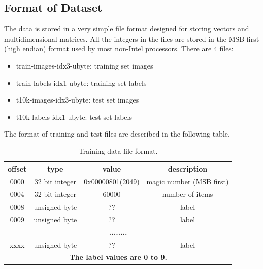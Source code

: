 \subsection{Format of Dataset}
The data is stored in a very simple file format designed for storing vectors and multidimensional matrices. All the integers in the files are stored in the MSB first (high endian) format used by most non-Intel processors. There are 4 files:
\begin{itemize}
  \item train-images-idx3-ubyte: training set images
  \item train-labels-idx1-ubyte: training set labels
  \item t10k-images-idx3-ubyte:  test set images
  \item t10k-labels-idx1-ubyte:  test set labels
\end{itemize}
The format of training and test files are described in the following table.
\begin{table}[ht]
\centering
\begin{tabular}{|c|c|c|c|}
\hline
\textbf{offset} & \textbf{type}    &      \textbf{value}    &      \textbf{description} \\
\hline
0000  &   32 bit integer & 0x00000801(2049) & magic number (MSB first) \\
\hline
0004  &   32 bit integer & 60000       &     number of items \\
\hline
0008  &   unsigned byte  & ??          &     label \\
\hline
0009  &   unsigned byte  & ??          &     label \\
\hline
\multicolumn{4}{|c|}{\textbf{........}} \\
\hline
xxxx  &   unsigned byte  & ??          &     label \\
\hline
\multicolumn{4}{|c|}{\textbf{The label values are 0 to 9.}} \\
\hline
\end{tabular}
\caption{Training data file format.}
\label{tbl:training-file-format}
\end{table}

